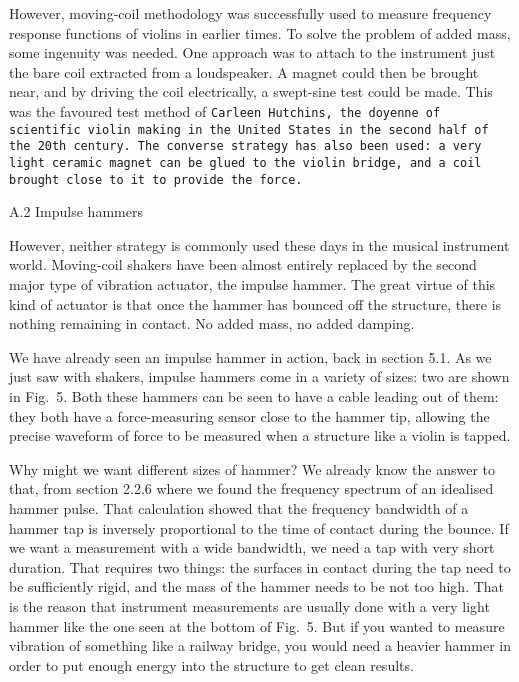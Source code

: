 

  However, moving-coil methodology was successfully used to measure frequency 
  response functions of violins in earlier times. To solve the problem of added 
  mass, some ingenuity was needed. One approach was to attach to the instrument 
  just the bare coil extracted from a loudspeaker. A magnet could then be 
  brought near, and by driving the coil electrically, a swept-sine test could 
  be made. This was the favoured test method of \tt{}Carleen Hutchins\rm{}, the 
  doyenne of scientific violin making in the United States in the second half 
  of the 20th century. The converse strategy has also been used: a very light 
  ceramic magnet can be glued to the violin bridge, and a coil brought close to 
  it to provide the force. 

  A.2 Impulse hammers 

  However, neither strategy is commonly used these days in the musical 
  instrument world. Moving-coil shakers have been almost entirely replaced by 
  the second major type of vibration actuator, the impulse hammer. The great 
  virtue of this kind of actuator is that once the hammer has bounced off the 
  structure, there is nothing remaining in contact. No added mass, no added 
  damping. 

  We have already seen an impulse hammer in action, back in section 5.1. As we 
  just saw with shakers, impulse hammers come in a variety of sizes: two are 
  shown in Fig.\ 5. Both these hammers can be seen to have a cable leading out 
  of them: they both have a force-measuring sensor close to the hammer tip, 
  allowing the precise waveform of force to be measured when a structure like a 
  violin is tapped. 


  Why might we want different sizes of hammer? We already know the answer to 
  that, from section 2.2.6 where we found the frequency spectrum of an 
  idealised hammer pulse. That calculation showed that the frequency bandwidth 
  of a hammer tap is inversely proportional to the time of contact during the 
  bounce. If we want a measurement with a wide bandwidth, we need a tap with 
  very short duration. That requires two things: the surfaces in contact during 
  the tap need to be sufficiently rigid, and the mass of the hammer needs to be 
  not too high. That is the reason that instrument measurements are usually 
  done with a very light hammer like the one seen at the bottom of Fig.\ 5. But 
  if you wanted to measure vibration of something like a railway bridge, you 
  would need a heavier hammer in order to put enough energy into the structure 
  to get clean results. 

